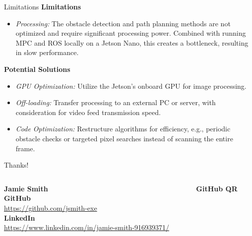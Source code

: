 \documentclass[aspectratio=169,12pt]{beamer}
\newcommand{\ghURL}{https://github.com/jsmith-exe}
\newcommand{\liURL}{https://www.linkedin.com/in/jamie-smith-916939371/}
\begin{document}
\begin{frame}[t]{Limitations}
  \vspace*{-0.3em}
  \textbf{Limitations}
  \begin{itemize}\setlength{\itemsep}{0.3em}
    \item \textit{Processing:} The obstacle detection and path planning methods are not optimized and require significant processing power. Combined with running MPC and ROS locally on a Jetson Nano, this creates a bottleneck, resulting in slow performance.
  \end{itemize}

  \textbf{Potential Solutions}
  \begin{itemize}
      \item \textit{GPU Optimization:} Utilize the Jetson’s onboard GPU for image processing.
      \item \textit{Off-loading:} Transfer processing to an external PC or server, with consideration for video feed transmission speed.
      \item \textit{Code Optimization:} Restructure algorithms for efficiency, e.g., periodic obstacle checks or targeted pixel searches instead of scanning the entire frame.
  \end{itemize}
\end{frame}



\begin{frame}{Thanks!}
  \vfill %
  \begin{columns}[c] %
    \begin{column}{0.5\textwidth}
      \centering
      {\Large \textbf{Jamie Smith}} \\[0.8em]

      \textbf{GitHub} \\
      \footnotesize \url{\ghURL} \\[1.0em]

      \textbf{LinkedIn} \\
      \footnotesize \url{\liURL}
    \end{column}

    \begin{column}{0.5\textwidth}
      \centering
      \textbf{GitHub QR} \\[0.4em]
       \\[1.5em]

    \end{column}
  \end{columns}
  \vfill
\end{frame}
\end{document}
